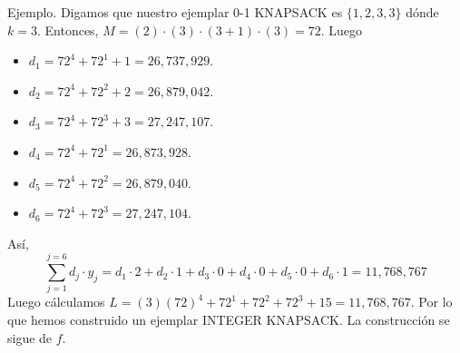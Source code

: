 \begin{frame}{Ejemplo.}
  Digamos que nuestro ejemplar 0-1 KNAPSACK es $\{1, 2, 3, 3\}$ dónde $k = 3$. Entonces,
  $M = (2) \cdot (3) \cdot (3 + 1) \cdot (3) = 72$. Luego
  \begin{itemize}[<+->]
  \item $d_1 = 72^4 + 72^1 + 1 = 26,737,929$. 
  \item $d_2 = 72^4 + 72^2 + 2 = 26,879,042$.
  \item $d_3 = 72^4 + 72^3 + 3 = 27, 247, 107$.
  \item $d_4 = 72^4 + 72^1 = 26,873,928$.
  \item $d_5 = 72^4 + 72^2 = 26,879,040$.
  \item $d_6 = 72^4 + 72^3 = 27,247,104$.
  \end{itemize}
  Así,
  \[\sum_{j = 1}^{j = 6} d_j \cdot y_j = d_1 \cdot 2 + d_2 \cdot 1 + d_3 \cdot 0 + d_4 \cdot 0 + d_5 \cdot 0 + d_6 \cdot 1 =  11,768,767\]
  Luego cálculamos $L = (3)(72)^4 + 72^1 + 72^2 + 72^3 + 15 = 11,768,767$. Por lo que hemos construido un ejemplar INTEGER KNAPSACK. La construcción se sigue de $f$.
  
\end{frame}
